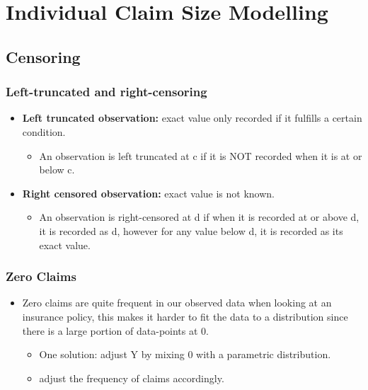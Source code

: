 \documentclass{article}
\begin{document}
\section{Individual Claim Size Modelling}

\subsection{Censoring}
\subsubsection{Left-truncated and right-censoring}
\begin{itemize}
    \item \textbf{Left truncated observation:} exact value only recorded if it fulfills a certain condition.
    \begin{itemize}
        \item An observation is left truncated at c if it is NOT recorded when it is at or below c.
    \end{itemize}
    \item \textbf{Right censored observation:} exact value is not known.
    \begin{itemize}
        \item An observation is right-censored at d if when it is recorded at or above d, it is recorded as d, however for any value below d, it is recorded as its exact value.
    \end{itemize}
\end{itemize}


\subsubsection{Zero Claims}

\begin{itemize}
    \item Zero claims are quite frequent in our observed data when looking at an insurance policy, this makes it harder to fit the data to a distribution since there is a large portion of data-points at 0.
    \begin{itemize}
        \item One solution: adjust Y by mixing 0 with a parametric distribution.
        \item adjust the frequency of claims accordingly.
    \end{itemize}
\end{itemize}
\end{document}
